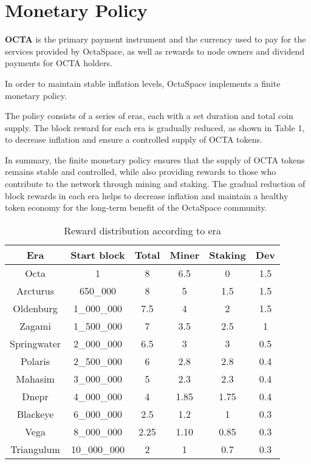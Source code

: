 \section{Monetary Policy}
\label{sec:mp}

\textbf{OCTA} is the primary payment instrument and the currency used to pay for the services provided by OctaSpace, as well as rewards to node owners and dividend payments for OCTA holders.

In order to maintain stable inflation levels, OctaSpace implements a finite monetary policy.

The policy consists of a series of eras, each with a set duration and total coin supply. The block reward for each era is gradually reduced, as shown in Table 1, to decrease inflation and ensure a controlled supply of OCTA tokens.


In summary, the finite monetary policy ensures that the supply of OCTA tokens remains stable and controlled, while also providing rewards to those who contribute to the network through mining and staking. The gradual reduction of block rewards in each era helps to decrease inflation and maintain a healthy token economy for the long-term benefit of the OctaSpace community.

\begin{table}[h!]
\centering
\begin{tabular}{||c c c c c c||}
    \hline
        Era & Start block & Total & Miner & Staking & Dev \\ [0.5ex]

        \hline\hline
        Octa & 1 & 8 & 6.5 & 0 & 1.5 \\
        Arcturus & 650\_000 & 8 & 5 & 1.5 & 1.5 \\
        Oldenburg & 1\_000\_000 & 7.5 & 4 & 2 & 1.5 \\
        Zagami & 1\_500\_000 & 7 & 3.5 & 2.5 & 1 \\
        Springwater & 2\_000\_000 & 6.5 & 3 & 3 & 0.5 \\
        Polaris & 2\_500\_000 & 6 & 2.8 & 2.8 & 0.4 \\
        Mahasim & 3\_000\_000 & 5 & 2.3 & 2.3 & 0.4 \\
        Dnepr & 4\_000\_000 & 4 & 1.85 & 1.75 & 0.4 \\
        Blackeye & 6\_000\_000 & 2.5 & 1.2 & 1 & 0.3 \\
        Vega & 8\_000\_000 & 2.25 & 1.10 & 0.85 & 0.3 \\
        Triangulum & 10\_000\_000 & 2 & 1 & 0.7 & 0.3 \\[1ex]
    \hline

\end{tabular}
\caption{Reward distribution according to era}
\label{table:1}
\end{table}

